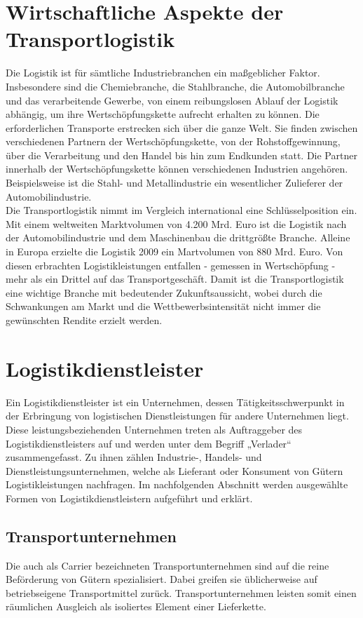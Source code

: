 \documentclass[a4paper,12pt]{scrreprt}
\begin{document}
	\chapter{Wirtschaftliche Aspekte der Transportlogistik}
	
	Die Logistik ist für sämtliche Industriebranchen ein maßgeblicher Faktor. Insbesondere sind die Chemiebranche, die Stahlbranche, die Automobilbranche und das verarbeitende Gewerbe, von einem reibungslosen Ablauf der Logistik abhängig, um ihre Wertschöpfungskette aufrecht erhalten zu können. Die erforderlichen Transporte erstrecken sich über die ganze Welt. Sie finden zwischen verschiedenen Partnern der Wertschöpfungskette, von der Rohstoffgewinnung, über die Verarbeitung und den Handel bis hin zum Endkunden statt. Die Partner innerhalb der Wertschöpfungskette können verschiedenen Industrien angehören. Beispielsweise ist die Stahl- und Metallindustrie ein wesentlicher Zulieferer der Automobilindustrie.\\
	
	Die Transportlogistik nimmt im Vergleich international eine Schlüsselposition ein. Mit einem weltweiten Marktvolumen von 4.200 Mrd. Euro ist die Logistik nach der Automobilindustrie und dem Maschinenbau die drittgrößte Branche. Alleine in Europa erzielte die Logistik 2009 ein Martvolumen von 880 Mrd. Euro. Von diesen erbrachten Logistikleistungen entfallen - gemessen in Wertschöpfung - mehr als ein Drittel auf das Transportgeschäft. Damit ist die Transportlogistik eine wichtige Branche mit bedeutender Zukunftsaussicht, wobei durch die Schwankungen am Markt und die Wettbewerbsintensität nicht immer die gewünschten Rendite erzielt werden.\\
	
	\chapter{Logistikdienstleister}
	Ein Logistikdienstleister ist ein Unternehmen, dessen Tätigkeitsschwerpunkt in der Erbringung von logistischen Dienstleistungen für andere Unternehmen liegt. Diese leistungsbeziehenden Unternehmen treten als Auftraggeber des Logistikdienstleisters auf und werden unter dem Begriff „Verlader“ zusammengefasst. Zu ihnen zählen Industrie-, Handels- und Dienstleistungsunternehmen, welche als Lieferant oder Konsument von Gütern Logistikleistungen nachfragen. Im nachfolgenden Abschnitt werden ausgewählte Formen von Logistikdienstleistern aufgeführt und erklärt.
	\section{Transportunternehmen}
	Die auch als Carrier bezeichneten Transportunternehmen sind	auf die reine Beförderung von Gütern spezialisiert. Dabei greifen sie üblicherweise auf betriebseigene Transportmittel zurück. Transportunternehmen leisten somit einen räumlichen Ausgleich als isoliertes Element einer Lieferkette. 
\end{document}
